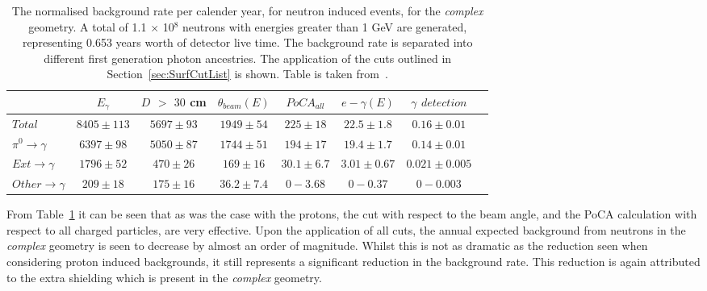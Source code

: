 \begin{table}
  \caption[The normalised background rate per calender year, for neutron induced events, for the \emph{complex} geometry]
          {The normalised background rate per calender year, for neutron induced events, for the \emph{complex} geometry. A total of 1.1 $\times$ 10$^8$ neutrons with energies greater than 1 GeV are generated, representing 0.653 years worth of detector live time. The background rate is separated into different first generation photon ancestries. The application of the cuts outlined in Section~\ref{sec:SurfCutList} is shown. Table is taken from~\citep{MartinsThesis}.}
  \label{tab:SurfNeuComp}
  \centering
  \scriptsize
  \begin{tabular}{l c c c c c c c }
    \toprule
        & $E_\gamma$ &  $D$ $>$ $30$ cm & $\theta_{beam}(E)$ & $PoCA_{all}$ & $e-\gamma(E)$ & $\gamma$ $detection$ \\
        \midrule
        $Total$          & $8405\pm113$ & $5697\pm93$ & $1949\pm54$  & $225\pm18$   & $22.5\pm1.8$  & $0.16\pm0.01$ \\

        $\pi^0\to\gamma$ & $6397\pm98$  & $5050\pm87$ & $1744\pm51$  & $194\pm17$   & $19.4\pm1.7$  & $0.14\pm0.01$ \\

        $Ext\to\gamma$   & $1796\pm52$  & $470\pm26$  & $169\pm16$   & $30.1\pm6.7$ & $3.01\pm0.67$ & $0.021\pm0.005$ \\

        $Other\to\gamma$ & $209\pm18$   & $175\pm16$  & $36.2\pm7.4$ & $0-3.68$     & $0-0.37$      & $0-0.003$ \\
        \bottomrule
  \end{tabular}
\end{table}

From Table~\ref{tab:SurfNeuComp} it can be seen that as was the case with the protons, the cut with respect to the beam angle, and the PoCA calculation with respect to all charged particles, are very effective. Upon the application of all cuts, the annual expected background from neutrons in the \emph{complex} geometry is seen to decrease by almost an order of magnitude. Whilst this is not as dramatic as the reduction seen when considering proton induced backgrounds, it still represents a significant reduction in the background rate. This reduction is again attributed to the extra shielding which is present in the \emph{complex} geometry. \\

